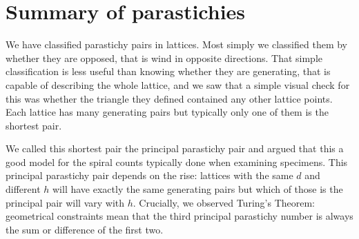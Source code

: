 \section{Summary of parastichies}
We have classified parastichy pairs in lattices. Most simply we classified them  by whether they are opposed, that is wind in opposite directions. That simple classification is less useful than knowing whether they are generating, that is capable of describing the whole lattice, and we saw that a simple visual check for this was whether the triangle they defined contained any other lattice points. Each lattice has many generating pairs but typically only one of them is the shortest pair. 

We called this shortest pair the principal parastichy pair and argued that this a good model for the spiral counts typically done when examining specimens. This principal parastichy pair depends on the rise: lattices with the same $d$ and different $h$ will have exactly the same generating pairs but which of those is the principal pair will vary with $h$. Crucially, we observed Turing's Theorem: geometrical constraints mean that the third principal parastichy number is always the sum or difference of the first two. 

